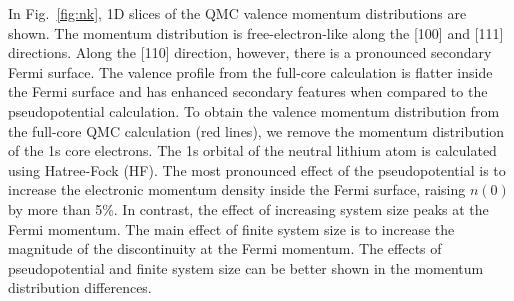 \documentclass[aps,prb,showpacs,preprintnumbers,amsmath,amssymb,superscriptaddress,twocolumn]{revtex4}
\begin{document}
In Fig.~\ref{fig:nk}, 1D slices of the QMC valence momentum distributions are shown. The momentum distribution is free-electron-like along the [100] and [111] directions. Along the [110] direction, however, there is a pronounced secondary Fermi surface. The valence profile from the full-core calculation is flatter inside the Fermi surface and has enhanced secondary features when compared to the pseudopotential calculation. To obtain the valence momentum distribution from the full-core QMC calculation (red lines), we remove the momentum distribution of the 1s core electrons. The 1s orbital of the neutral lithium atom is calculated using Hatree-Fock (HF). The most pronounced effect of the pseudopotential is to increase the electronic momentum density inside the Fermi surface, raising $n(0)$ by more than 5\%. In contrast, the effect of increasing system size peaks at the Fermi momentum. The main effect of finite system size is to increase the magnitude of the discontinuity at the Fermi momentum. The effects of pseudopotential and finite system size can be better shown in the momentum distribution differences.
\end{document}
